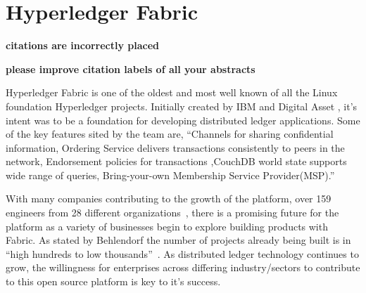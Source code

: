 \section{Hyperledger Fabric}

{\bf citations are incorrectly placed}

{\bf please improve citation labels of all your abstracts}

Hyperledger Fabric is one of the oldest and most well known of all the
Linux foundation Hyperledger projects. Initially created by IBM and
Digital Asset , it’s intent was to be a foundation for developing
distributed ledger applications. Some of the key features sited by the
team are, ``Channels for sharing confidential information, Ordering
Service delivers transactions consistently to peers in the network,
Endorsement policies for transactions ,CouchDB world state supports
wide range of queries, Bring-your-own Membership Service
Provider(MSP).''~\cite{Hyperledger Fabric}

With many companies contributing to the growth of the platform, over
159 engineers from 28 different organizations~\cite{Behlendorf
  Interview}, there is a promising future for the platform as a
variety of businesses begin to explore building products with
Fabric. As stated by Behlendorf the number of projects already being
built is in 
``high hundreds to low thousands''~\cite{Behlendorf Interview}. 
As distributed ledger technology continues to grow, the
willingness for enterprises across differing industry/sectors to
contribute to this open source platform is key to it's success.

